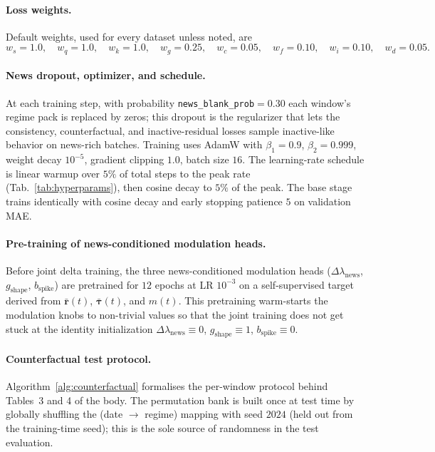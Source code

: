 \documentclass{article}
\begin{document}
\paragraph{Loss weights.}
Default weights, used for every dataset unless noted, are
\[
w_s{=}1.0,\quad w_q{=}1.0,\quad w_k{=}1.0,\quad w_g{=}0.25,\quad
w_c{=}0.05,\quad w_f{=}0.10,\quad w_i{=}0.10,\quad w_d{=}0.05.
\]

\paragraph{News dropout, optimizer, and schedule.}
At each training step, with probability \texttt{news\_blank\_prob}${=}0.30$ each window's regime pack is replaced by zeros; this dropout is the regularizer that lets the consistency, counterfactual, and inactive-residual losses sample inactive-like behavior on news-rich batches. Training uses AdamW with $\beta_1{=}0.9$, $\beta_2{=}0.999$, weight decay $10^{-5}$, gradient clipping $1.0$, batch size $16$. The learning-rate schedule is linear warmup over $5\%$ of total steps to the peak rate (Tab.~\ref{tab:hyperparams}), then cosine decay to $5\%$ of the peak. The base stage trains identically with cosine decay and early stopping patience $5$ on validation MAE.

\paragraph{Pre-training of news-conditioned modulation heads.}
Before joint delta training, the three news-conditioned modulation heads ($\Delta\lambda_{\text{news}}$, $g_{\text{shape}}$, $b_{\text{spike}}$) are pretrained for $12$ epochs at LR $10^{-3}$ on a self-supervised target derived from $\bar{\bm r}(t)$, $\bar{\bm\tau}(t)$, and $m(t)$. This pretraining warm-starts the modulation knobs to non-trivial values so that the joint training does not get stuck at the identity initialization $\Delta\lambda_{\text{news}}{\equiv}0$, $g_{\text{shape}}{\equiv}1$, $b_{\text{spike}}{\equiv}0$.

\paragraph{Counterfactual test protocol.}
Algorithm~\ref{alg:counterfactual} formalises the per-window protocol behind Tables~3 and 4 of the body. The permutation bank is built once at test time by globally shuffling the (date $\to$ regime) mapping with seed $2024$ (held out from the training-time seed); this is the sole source of randomness in the test evaluation.
\end{document}
